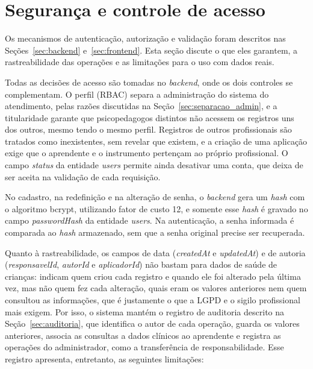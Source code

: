 \section{Segurança e controle de acesso}\label{sec:seguranca}

Os mecanismos de autenticação, autorização e validação foram descritos nas Seções~\ref{sec:backend} e~\ref{sec:frontend}. Esta seção discute o que eles garantem, a rastreabilidade das operações e as limitações para o uso com dados reais.

Todas as decisões de acesso são tomadas no \textit{backend}, onde os dois controles se complementam. O perfil (RBAC) separa a administração do sistema do atendimento, pelas razões discutidas na Seção~\ref{sec:separacao_admin}, e a titularidade garante que psicopedagogos distintos não acessem os registros uns dos outros, mesmo tendo o mesmo perfil. Registros de outros profissionais são tratados como inexistentes, sem revelar que existem, e a criação de uma aplicação exige que o aprendente e o instrumento pertençam ao próprio profissional. O campo \textit{status} da entidade \textit{users} permite ainda desativar uma conta, que deixa de ser aceita na validação de cada requisição.

No cadastro, na redefinição e na alteração de senha, o \textit{backend} gera um \textit{hash} com o algoritmo bcrypt, utilizando fator de custo 12, e somente esse \textit{hash} é gravado no campo \textit{passwordHash} da entidade \textit{users}. Na autenticação, a senha informada é comparada ao \textit{hash} armazenado, sem que a senha original precise ser recuperada.

Quanto à rastreabilidade, os campos de data (\textit{createdAt} e \textit{updatedAt}) e de autoria (\textit{responsavelId}, \textit{autorId} e \textit{aplicadorId}) não bastam para dados de saúde de crianças: indicam quem criou cada registro e quando ele foi alterado pela última vez, mas não quem fez cada alteração, quais eram os valores anteriores nem quem consultou as informações, que é justamente o que a LGPD e o sigilo profissional mais exigem. Por isso, o sistema mantém o registro de auditoria descrito na Seção~\ref{sec:auditoria}, que identifica o autor de cada operação, guarda os valores anteriores, associa as consultas a dados clínicos ao aprendente e registra as operações do administrador, como a transferência de responsabilidade. Esse registro apresenta, entretanto, as seguintes limitações:

